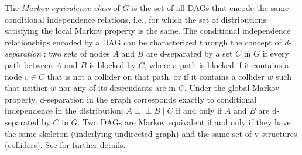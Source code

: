 \documentclass[11pt,a4paper]{article}
\numberwithin{equation}{section}
\begin{document}
The \emph{Markov equivalence class} of $G$ is the set of all DAGs that encode the same conditional independence relations, i.e., for which the set of distributions satisfying the local Markov property is the same. The conditional independence relationships encoded by a DAG can be characterized through the concept of \emph{d-separation} \citep{pearl:causality:2009}: two sets of nodes $A$ and $B$ are d-separated by a set $C$ in $G$ if every path between $A$ and $B$ is blocked by $C$, where a path is blocked if it contains a node $v \in C$ that is not a collider on that path, or if it contains a collider $w$ such that neither $w$ nor any of its descendants are in $C$. Under the global Markov property, d-separation in the graph corresponds exactly to conditional independence in the distribution: $A \perp\!\!\!\perp B \mid C$ if and only if $A$ and $B$ are d-separated by $C$ in $G$. Two DAGs are Markov equivalent if and only if they have the same skeleton (underlying undirected graph) and the same set of v-structures (colliders). See \citet[Chap.~1]{handbook} for further details.
\end{document}
